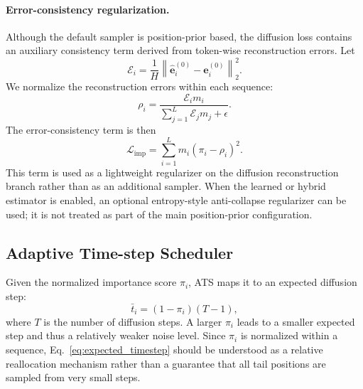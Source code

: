 \documentclass[runningheads,a4paper]{llncs}
\begin{document}
\paragraph{Error-consistency regularization.}
Although the default sampler is position-prior based, the diffusion loss contains an auxiliary consistency term derived from token-wise reconstruction errors. Let
\begin{equation}
    \mathcal{E}_i=\frac{1}{H}\left\|\hat{\mathbf{e}}^{(0)}_i-\mathbf{e}^{(0)}_i\right\|_2^2.
\end{equation}
We normalize the reconstruction errors within each sequence:
\begin{equation}
    \rho_i=\frac{\mathcal{E}_i m_i}{\sum_{j=1}^{L}\mathcal{E}_jm_j+\epsilon}.
\end{equation}
The error-consistency term is then
\begin{equation}
    \mathcal{L}_{\mathrm{imp}}=\sum_{i=1}^{L}m_i(\pi_i-\rho_i)^2.
    \label{eq:importance_regularization}
\end{equation}
This term is used as a lightweight regularizer on the diffusion reconstruction branch rather than as an additional sampler. When the learned or hybrid estimator is enabled, an optional entropy-style anti-collapse regularizer can be used; it is not treated as part of the main position-prior configuration.

\subsection{Adaptive Time-step Scheduler}
\label{subsec:ats}

Given the normalized importance score $\pi_i$, ATS maps it to an expected diffusion step:
\begin{equation}
    \bar{t}_i=(1-\pi_i)(T-1),
    \label{eq:expected_timestep}
\end{equation}
where $T$ is the number of diffusion steps. A larger $\pi_i$ leads to a smaller expected step and thus a relatively weaker noise level. Since $\pi_i$ is normalized within a sequence, Eq.~\eqref{eq:expected_timestep} should be understood as a relative reallocation mechanism rather than a guarantee that all tail positions are sampled from very small steps.
\end{document}
